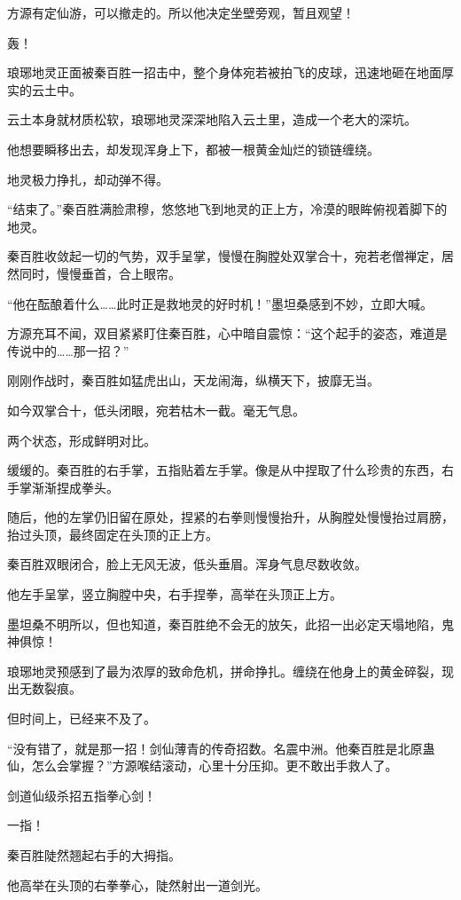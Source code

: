 \begin{this_body}
方源有定仙游，可以撤走的。所以他决定坐壁旁观，暂且观望！

轰！

琅琊地灵正面被秦百胜一招击中，整个身体宛若被拍飞的皮球，迅速地砸在地面厚实的云土中。

云土本身就材质松软，琅琊地灵深深地陷入云土里，造成一个老大的深坑。

他想要瞬移出去，却发现浑身上下，都被一根黄金灿烂的锁链缠绕。

地灵极力挣扎，却动弹不得。

“结束了。”秦百胜满脸肃穆，悠悠地飞到地灵的正上方，冷漠的眼眸俯视着脚下的地灵。

秦百胜收敛起一切的气势，双手呈掌，慢慢在胸膛处双掌合十，宛若老僧禅定，居然同时，慢慢垂首，合上眼帘。

“他在酝酿着什么……此时正是救地灵的好时机！”墨坦桑感到不妙，立即大喊。

方源充耳不闻，双目紧紧盯住秦百胜，心中暗自震惊：“这个起手的姿态，难道是传说中的……那一招？”

刚刚作战时，秦百胜如猛虎出山，天龙闹海，纵横天下，披靡无当。

如今双掌合十，低头闭眼，宛若枯木一截。毫无气息。

两个状态，形成鲜明对比。

缓缓的。秦百胜的右手掌，五指贴着左手掌。像是从中捏取了什么珍贵的东西，右手掌渐渐捏成拳头。

随后，他的左掌仍旧留在原处，捏紧的右拳则慢慢抬升，从胸膛处慢慢抬过肩膀，抬过头顶，最终固定在头顶的正上方。

秦百胜双眼闭合，脸上无风无波，低头垂眉。浑身气息尽数收敛。

他左手呈掌，竖立胸膛中央，右手捏拳，高举在头顶正上方。

墨坦桑不明所以，但也知道，秦百胜绝不会无的放矢，此招一出必定天塌地陷，鬼神俱惊！

琅琊地灵预感到了最为浓厚的致命危机，拼命挣扎。缠绕在他身上的黄金碎裂，现出无数裂痕。

但时间上，已经来不及了。

“没有错了，就是那一招！剑仙薄青的传奇招数。名震中洲。他秦百胜是北原蛊仙，怎么会掌握？”方源喉结滚动，心里十分压抑。更不敢出手救人了。

剑道仙级杀招五指拳心剑！

一指！

秦百胜陡然翘起右手的大拇指。

他高举在头顶的右拳拳心，陡然射出一道剑光。


\end{this_body}
